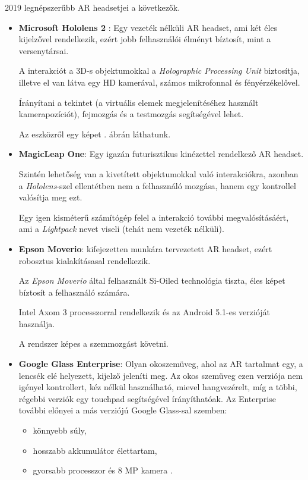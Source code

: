 2019 legnépszerűbb AR headsetjei a következők.
\begin{itemize}
\item {\bf Microsoft Hololens 2} \cite{kalantari2018exploring}: Egy vezeték nélküli AR headset, ami két éles kijelzővel rendelkezik, ezért jobb felhasználói élményt bíztosít, mint a versenytársai.

A interakciót a 3D-s objektumokkal a \textit{Holographic Processing Unit} biztosítja, illetve el van látva egy HD kamerával, számos mikrofonnal és fényérzékelővel.

Írányítani a tekintet (a virtuális elemek megjelenítéséhez használt kamerapozíciót), fejmozgás és a testmozgás segítségével lehet.

Az eszközről egy képet . ábrán láthatunk.

\item {\bf MagicLeap One}: Egy igazán futurisztikus kinézettel rendelkező AR headset.

Szintén lehetőség van a kivetített objektumokkal való interakciókra, azonban a \textit{Hololens}-szel ellentétben nem a felhasználó mozgása, hanem egy kontrollel valósítja meg ezt. 

Egy igen kisméterű számítógép felel a interakció további megvalósításáért, ami a \textit{Lightpack} nevet viseli (tehát nem vezeték nélküli).
  
\item {\bf Epson Moverio}: kifejezetten munkára tervezetett AR headset, ezért robosztus kialakításasal rendelkezik.

Az \textit{Epson Moverio} által felhasznált Si-Oiled technológia tiszta, éles képet bíztosít a felhasználó számára.

Intel Axom 3 processzorral rendelkezik és az Android 5.1-es verzióját használja. 

A rendszer képes a szemmozgást követni.

\item {\bf Google Glass Enterprise}: Olyan okoszemüveg, ahol az AR tartalmat egy, a lencsék elé helyezett, kijelző jeleníti meg. 
Az okos szemüveg ezen verziója nem igényel kontrollert, kéz nélkül használható, mievel hangvezérelt, míg a többi, régebbi verziók egy touchpad segítségével írányíthatóak.
Az Enterprise további előnyei a más verziójú Google Glass-sal szemben:
\begin{itemize}
\item könnyebb súly,
\item hosszabb akkumulátor élettartam,
\item gyorsabb processzor és 8 MP kamera \cite{arhardware}.
\end{itemize}
\end{itemize}

